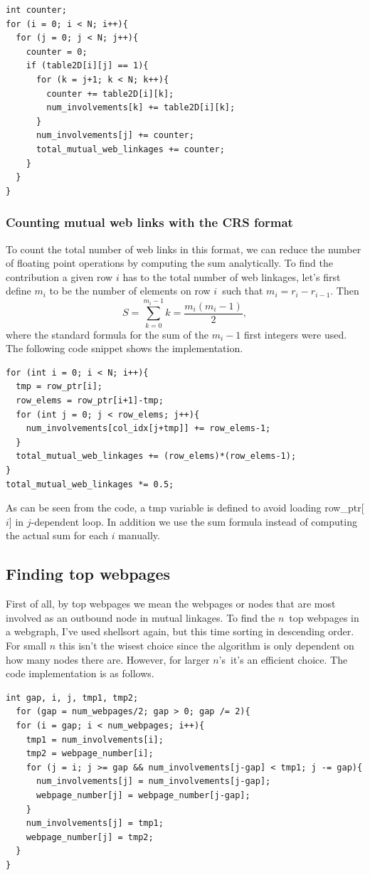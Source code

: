 \documentclass[english,notitlepage, reprint]{revtex4-1}  %
\begin{document}
\begin{lstlisting}[style=customc]
int counter;
for (i = 0; i < N; i++){
  for (j = 0; j < N; j++){
    counter = 0;
    if (table2D[i][j] == 1){
      for (k = j+1; k < N; k++){
        counter += table2D[i][k];
        num_involvements[k] += table2D[i][k];
      }
      num_involvements[j] += counter;
      total_mutual_web_linkages += counter;
    }
  }
}
\end{lstlisting}

\subsubsection{Counting mutual web links with the CRS format}
To count the total number of web links in this format, we can reduce the number of floating point operations by computing the sum analytically. To find the contribution a given row $i$ has to the total number of web linkages, let's first define $m_i$ to be the number of elements on row $i$ such that $m_i = r_i - r_{i-1}$. Then
\begin{equation}
    S = \sum_{k = 0}^{m_i-1} k = \frac{m_i(m_i-1)}{2},
\end{equation}
where the standard formula for the sum of the $m_i-1$ first integers were used. The following code snippet shows the implementation.

\begin{lstlisting}[style=customc]
for (int i = 0; i < N; i++){
  tmp = row_ptr[i];
  row_elems = row_ptr[i+1]-tmp;
  for (int j = 0; j < row_elems; j++){
    num_involvements[col_idx[j+tmp]] += row_elems-1;
  }
  total_mutual_web_linkages += (row_elems)*(row_elems-1);
}
total_mutual_web_linkages *= 0.5;
\end{lstlisting}
As can be seen from the code, a tmp variable is defined to avoid loading row\_ptr[$i$] in $j$-dependent loop. In addition we use the sum formula instead of computing the actual sum for each $i$ manually.

\subsection*{Finding top webpages}
First of all, by top webpages we mean the webpages or nodes that are most involved as an outbound node in mutual linkages. To find the $n$ top webpages in a webgraph, I've used shellsort again, but this time sorting in descending order. For small $n$ this isn't the wisest choice since the algorithm is only dependent on how many nodes there are. However, for larger $n$'s it's an efficient choice. The code implementation is as follows.
\begin{lstlisting}[style=customc]
int gap, i, j, tmp1, tmp2;
  for (gap = num_webpages/2; gap > 0; gap /= 2){
  for (i = gap; i < num_webpages; i++){
    tmp1 = num_involvements[i];
    tmp2 = webpage_number[i];
    for (j = i; j >= gap && num_involvements[j-gap] < tmp1; j -= gap){
      num_involvements[j] = num_involvements[j-gap];
      webpage_number[j] = webpage_number[j-gap];
    }
    num_involvements[j] = tmp1;
    webpage_number[j] = tmp2;
  }
}
\end{lstlisting}
\end{document}
